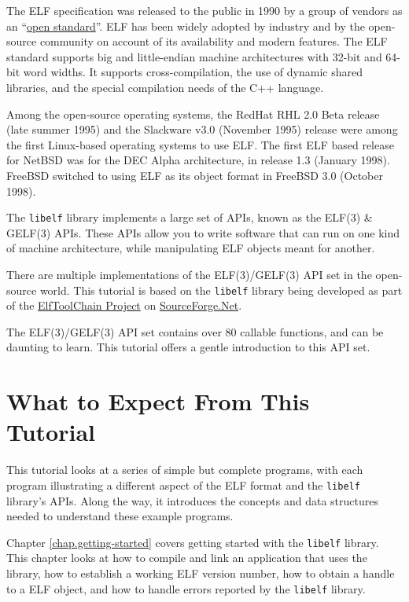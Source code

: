 \documentclass[a4paper,pdftex]{book}
\newcommand{\elftoolchainproject}{\href{https://elftoolchain.sourceforge.io/}%
    {ElfToolChain Project}\xspace}%
\newcommand{\library}[1]{\texttt{#1}}
\newcommand{\reg}{\raisebox{0.7ex}{\small\textregistered}\xspace}
\newcommand{\trade}{{\small\texttrademark}\xspace}
\begin{document}
The ELF specification was released to the public in
1990 by a group of vendors as an
``\href{https://refspecs.linuxbase.org/elf/elf.pdf}{open
  standard}''. ELF has been widely adopted by industry and by the
open-source community on account of its availability and modern
features.  The ELF standard supports big and little-endian machine
architectures with 32-bit and 64-bit word widths. It supports
cross-compilation, the use of dynamic shared libraries, and the
special compilation needs of the C++ language.

Among the open-source operating systems, the
RedHat\trade RHL 2.0 Beta release (late summer 1995) and the Slackware
v3.0 (November 1995) release were among the first Linux\reg-based
operating systems to use ELF.  The first ELF based release for
NetBSD\reg was for the DEC Alpha\trade architecture, in release 1.3
(January 1998).  FreeBSD\trade switched to using ELF as its object
format in FreeBSD 3.0 (October 1998).

The \library{libelf} library implements a large set of APIs, known as
the ELF(3) \& GELF(3) APIs.
These APIs allow you to write software that can run on one kind of
machine architecture, while manipulating ELF objects meant for
another.

There are multiple implementations of the ELF(3)/GELF(3) API set in
the open-source world.  This tutorial is based on the \library{libelf}
library being developed as part of the \elftoolchainproject on
\href{https://sourceforge.net/}{SourceForge.Net}.

The ELF(3)/GELF(3) API set contains over 80 callable functions, and
can be daunting to learn.  This tutorial offers a gentle introduction
to this API set.

\section{What to Expect From This Tutorial}

This tutorial looks at a series of simple but complete programs, with
each program illustrating a different aspect of the ELF format and the
\library{libelf} library's APIs. Along the way, it introduces the
concepts and data structures needed to understand these example
programs.

Chapter \ref{chap.getting-started} covers getting started with the
\library{libelf} library. This chapter looks at how to compile and
link an application that uses the library, how to establish a working
ELF version number, how to obtain a handle to a ELF object, and how to
handle errors reported by the \library{libelf} library.
\end{document}
